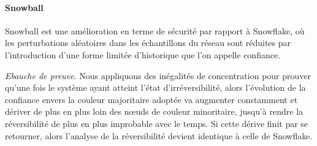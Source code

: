 \documentclass[a4,twocolumn,10pt]{article}
\theoremstyle{definition}
\begin{document}

\paragraph{Snowball}

Snowball est une amélioration en terme de sécurité par rapport à Snowflake, où les perturbations aléatoires dans les
échantillons du réseau sont réduites par l'introduction d'une forme limitée d'historique que l'on appelle confiance.

\noindent \emph{Ebauche de preuve}. Nous appliquons des inégalités de concentration pour prouver qu'une fois le système
ayant atteint l'état d'irréversibilité, alors l'évolution de la confiance envers la couleur majoritaire adoptée va
augmenter constamment et dériver de plus en plus loin des nœuds de couleur minoritaire, jusqu'à rendre la réversibilité
de plus en plus improbable avec le temps. Si cette dérive finit par se retourner, alors l'analyse de la réversibilité
devient identique à celle de Snowflake.

\end{document}
